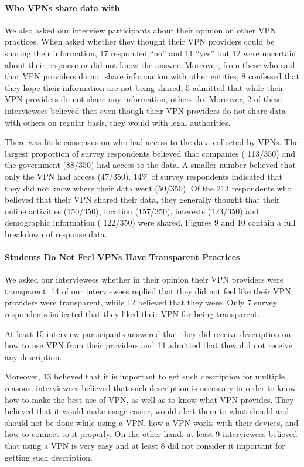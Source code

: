 \paragraph{Who VPNs share data with} We also asked our interview participants
about their opinion on other VPN practices. When asked whether they thought
their VPN providers could be sharing their information, 17 responded “no” and
11 “yes” but 12 were uncertain about their response or did not know the
answer.  Moreover, from these who said that VPN providers do not share
information with other entities, 8 confessed that they hope their information
are not being shared, 5 admitted that while their VPN providers do not share
any information, others do. Moreover, 2 of these interviewees believed that
even though their VPN providers do not share data with others on regular
basis, they would with legal authorities. 

There was little consensus on who had access to the data collected by VPNs.
The largest proportion of survey respondents believed that companies (
113/350) and the government (88/350) had access to the data. A
smaller number believed that only the VPN had access (47/350). 14\% of survey respondents indicated that they did not know where
their data went (50/350). Of the 213 respondents who believed that their
VPN shared their data, they generally thought that their online activities
(150/350), location (157/350), interests (123/350) and
demographic information ( 122/350) were shared. Figures 9 and 10 contain
a full breakdown of response data.

\paragraph{Students Do Not Feel VPNs Have Transparent Practices}
We asked our interviewees whether in
their opinion their VPN providers were transparent. 14 of our interviewees
replied that they did not feel like their VPN providers were transparent,
while 12 believed that they were. Only 7 survey respondents indicated that they liked their VPN for being transparent.

At least 15 interview participants answered that they did receive description
on how to use VPN from their providers and 14 admitted that they did not
receive any description.  

Moreover, 13 believed that it is important to get such description for
multiple reasons; interviewees believed that such description is necessary in
order to know how to make the best use of VPN, as well as to know what VPN
provides. They believed that it would make usage easier, would alert them to what should and should not be done while using a VPN, how a
VPN works with their devices, and how to connect to it properly. On the
other hand, at least 9 interviewees believed that using a VPN is very easy and
at least 8 did not consider it important for getting such description. 


